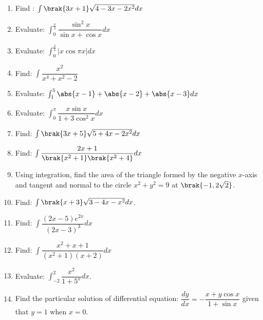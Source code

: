 \begin{enumerate}
    \item Find : $\int{\brak{3x+1}\sqrt{4 - 3x - 2x^2}dx}$
    \item Evaluate: $ \int^{\frac{\pi}{2}}_0{\dfrac{\sin^2{x}}{\sin{x} + \cos{x}}dx}$
    \item Evaluate: $\int^{\frac{3}{2}}_0{|x\cos{\pi x}|dx}$
    \item Find: $\int{\dfrac{x^2}{x^4 + x^2 -2}}$
    \item Evaluate: $\int^5_1{\abs{x-1} + \abs{x-2} + \abs{x-3} dx}$
    \item Evaluate: $ \int^{\pi}_0{\dfrac{x\sin{x}}{1 + 3\cos^2{x}}dx}$
    \item Find: $\int{\brak{3x+5}\sqrt{5 + 4x - 2x^2}dx}$
    \item Find: $\int{\dfrac{2x+1}{\brak{x^2 + 1}\brak{x^2 + 4}}dx}$
    \item Using integration, find the area of the triangle formed by the negative $x$-axis and tangent and normal to the circle $x^2 + y^2 = 9$ at $\brak{-1,2\sqrt{2}}$.
    \item Find: $\int{\brak{x+3}\sqrt{3 - 4x - x^2}dx}$.

    \item Find: $\int{\dfrac{(2x - 5)e^{2x}}{(2x-3)^3}dx}$

    \item Find: $\int{\dfrac{x^2+x+1}{(x^2+1)(x+2)}dx}$

    \item Evaluate: $\int_{-2}^{2}\dfrac{x^2}{1+5^x}dx$.

    \item Find the particular solution of differential equation: $\dfrac{dy}{dx} = -\dfrac{x+y\cos{x}}{1+\sin{x}}$ given that $y = 1$ when $x=0$.


\end{enumerate}
